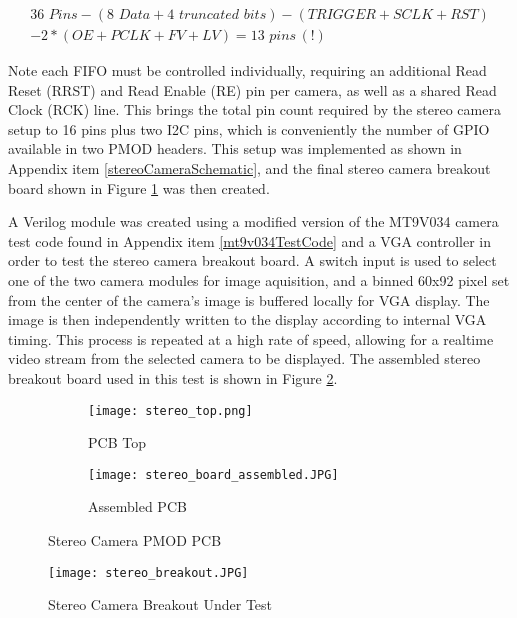 \begin{equation}
\label{lowerPincount}
\begin{split}
36\,\, Pins - (8\,\,Data + 4 \,\,truncated\,\,bits) - (TRIGGER+SCLK+RST) \\ - 2*(OE+PCLK+FV+LV) = 13\,\,pins\,(!) 
\end{split}
\end{equation}
\par
Note each FIFO must be controlled individually, requiring an additional Read Reset (RRST) and Read Enable (RE) pin per camera, as well as a shared Read Clock (RCK) line. This brings the total pin count required by the stereo camera setup to 16 pins plus two I2C pins, which is conveniently the number of GPIO available in two PMOD headers. This setup was implemented as shown in Appendix item \ref{stereoCameraSchematic}, and the final stereo camera breakout board shown in Figure \ref{stereoCameraBoard} was then created.  
\par
A Verilog module was created using a modified version of the MT9V034 camera test code found in Appendix item \ref{mt9v034TestCode} and a VGA controller in order to test the stereo camera breakout board. A switch input is used to select one of the two camera modules for image aquisition, and a binned 60x92 pixel set from the center of the camera's image is buffered locally for VGA display. The image is then independently written to the display according to internal VGA timing. This process is repeated at a high rate of speed, allowing for a realtime video stream from the selected camera to be displayed. The assembled stereo breakout board used in this test is shown in Figure \ref{stereoTestSetup}.
\begin{figure}[H] 
	\begin{subfigure}{1\textwidth}
	\centering
		\texttt{[image: stereo\_top.png]}
		\caption{PCB Top}
	\end{subfigure}
	\begin{subfigure}{1\textwidth}
	\centering
		\texttt{[image: stereo\_board\_assembled.JPG]}
		\caption{Assembled PCB}
	\end{subfigure}
	\caption{Stereo Camera PMOD PCB}
	\label{stereoCameraBoard}
\end{figure}
\par
\begin{figure}[H] 
	\centering
	\texttt{[image: stereo\_breakout.JPG]}
	\caption{Stereo Camera Breakout Under Test}
	\label{stereoTestSetup}
\end{figure}

